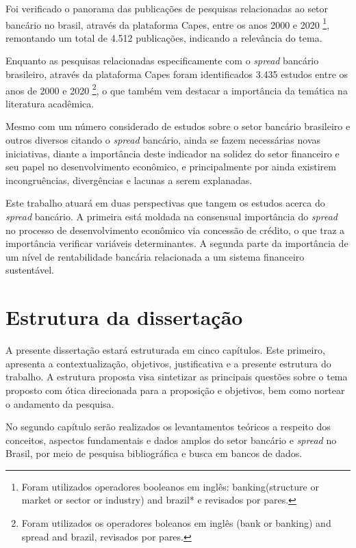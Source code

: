 \documentclass[12pt,12pt,openright,oneside,a4paper,chapter=TITLE,section=TITLE,subsection=TITLE,subsubsection=TITLE,english,french,spanish,portugues,sumario=tradicional]{abntex2}
\begin{document}
Foi verificado o panorama das publicações de pesquisas relacionadas ao setor bancário no brasil, através da plataforma Capes, entre os anos 2000 e 2020
\footnote{Foram utilizados operadores booleanos em inglês: banking(structure or
market or sector or industry) and brazil* e revisados por pares.}, remontando um total de 4.512 publicações, indicando a relevância do tema.

Enquanto as pesquisas relacionadas especificamente com o \emph{spread} bancário brasileiro, através da plataforma Capes foram identificados 3.435 estudos entre os anos de 2000 e 2020 \footnote{Foram utilizados os operadores boleanos em
inglês (bank or banking) and spread and brazil, revisados por pares.}, o que também vem destacar a importância da temática na literatura acadêmica.

Mesmo com um número considerado de estudos sobre o setor bancário brasileiro e outros diversos citando o \emph{spread} bancário, ainda se fazem necessárias novas iniciativas, diante a importância deste indicador na solidez do setor financeiro e seu papel no desenvolvimento econômico, e principalmente por ainda existirem incongruências, divergências e lacunas a serem explanadas.

Este trabalho atuará em duas perspectivas que tangem os estudos acerca do \emph{spread} bancário. A primeira está moldada na consensual importância do \emph{spread} no processo de desenvolvimento econômico via concessão de crédito, o que traz a importância verificar variáveis determinantes. A segunda parte da importância de um nível de rentabilidade bancária relacionada a um sistema financeiro sustentável.

\section{Estrutura da dissertação}

A presente dissertação estará estruturada em cinco capítulos. Este primeiro, apresenta a contextualização, objetivos, justificativa e a presente estrutura do trabalho. A estrutura proposta visa sintetizar as principais questões sobre o tema proposto com ótica direcionada para a proposição e objetivos, bem como nortear o andamento da pesquisa.

No segundo capítulo serão realizados os levantamentos teóricos a respeito dos conceitos, aspectos fundamentais e dados amplos do setor bancário e \emph{spread} no Brasil, por meio de pesquisa bibliográfica e busca em bancos de dados.
\end{document}
